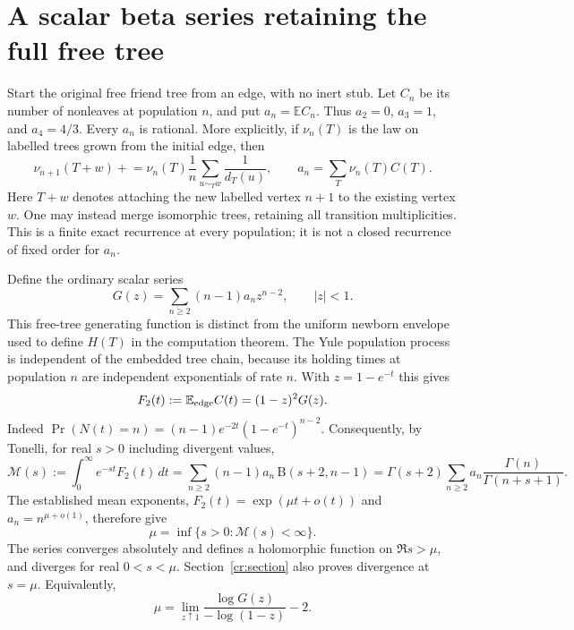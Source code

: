 \section{A scalar beta series retaining the full free tree}
\label{hfk:section}

Start the original free friend tree from an edge, with no inert stub.
Let $C_n$ be its number of nonleaves at population $n$, and put
$a_n=\mathbb E C_n$. Thus $a_2=0$, $a_3=1$, and $a_4=4/3$.
Every $a_n$ is rational. More explicitly, if $\nu_n(T)$ is the law on
labelled trees grown from the initial edge, then
\[
 \nu_{n+1}(T+w)\mathrel{+}=\nu_n(T)\frac1n
       \sum_{u\sim_Tw}\frac1{d_T(u)},\qquad
 a_n=\sum_T\nu_n(T)C(T).
\]
Here $T+w$ denotes attaching the new labelled vertex $n+1$ to the
existing vertex $w$.
One may instead merge isomorphic trees, retaining all transition
multiplicities. This is a finite exact recurrence at every population;
it is not a closed recurrence of fixed order for $a_n$.

Define the ordinary scalar series
\[
 G(z)=\sum_{n\ge2}(n-1)a_nz^{n-2},\qquad |z|<1.
\]
This free-tree generating function is distinct from the uniform
newborn envelope used to define $H(T)$ in the computation theorem.
The Yule population process is independent of the embedded tree chain,
because its holding times at population $n$ are independent exponentials
of rate $n$. With $z=1-e^{-t}$ this gives
\begin{equation}\label{hfk:yule}
 F_2(t):=\mathbb E_{\rm edge}C(t)
   =(1-z)^2G(z).
\end{equation}
Indeed $\Pr(N(t)=n)=(n-1)e^{-2t}(1-e^{-t})^{n-2}$.
Consequently, by Tonelli, for real $s>0$ including divergent values,
\begin{equation}\label{hfk:mellin}
 \mathcal M(s):=\int_0^\infty e^{-st}F_2(t)\,dt
  =\sum_{n\ge2}(n-1)a_n\,\mathrm B(s+2,n-1)
  =\Gamma(s+2)\sum_{n\ge2}
       a_n\frac{\Gamma(n)}{\Gamma(n+s+1)}.
\end{equation}
The established mean exponents\cite{Long,Uzay},
$F_2(t)=\exp(\mu t+o(t))$ and $a_n=n^{\mu+o(1)}$, therefore give
\begin{equation}\label{hfk:abscissa}
 \mu=\inf\{s>0:\mathcal M(s)<\infty\}.
\end{equation}
The series converges absolutely and defines a holomorphic function on
$\Re s>\mu$, and diverges for real $0<s<\mu$. Section~\ref{cr:section}
also proves divergence at $s=\mu$. Equivalently,
\[
 \mu=\lim_{z\uparrow1}
       \frac{\log G(z)}{-\log(1-z)}-2.
\]


